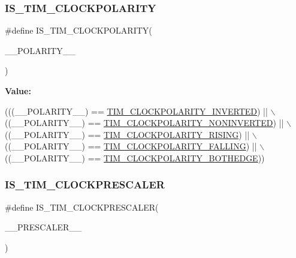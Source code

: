 \subsubsection{\texorpdfstring{I\+S\+\_\+\+T\+I\+M\+\_\+\+C\+L\+O\+C\+K\+P\+O\+L\+A\+R\+I\+TY}{IS\_TIM\_CLOCKPOLARITY}}
{\footnotesize\ttfamily \#define I\+S\+\_\+\+T\+I\+M\+\_\+\+C\+L\+O\+C\+K\+P\+O\+L\+A\+R\+I\+TY(\begin{DoxyParamCaption}\item[{}]{\+\_\+\+\_\+\+P\+O\+L\+A\+R\+I\+T\+Y\+\_\+\+\_\+ }\end{DoxyParamCaption})}

{\bfseries Value\+:}
\begin{DoxyCode}
(((\_\_POLARITY\_\_) == \hyperlink{group___t_i_m___clock___polarity_gae4eb585c466c2b5709ae3795204e7d3f}{TIM\_CLOCKPOLARITY\_INVERTED})    || \(\backslash\)
                                            ((\_\_POLARITY\_\_) == 
      \hyperlink{group___t_i_m___clock___polarity_gaca342866be2f9364274584688c733b60}{TIM\_CLOCKPOLARITY\_NONINVERTED}) || \(\backslash\)
                                            ((\_\_POLARITY\_\_) == 
      \hyperlink{group___t_i_m___clock___polarity_ga13cc7002cfa5ee42607e1a3d85f77b10}{TIM\_CLOCKPOLARITY\_RISING})      || \(\backslash\)
                                            ((\_\_POLARITY\_\_) == 
      \hyperlink{group___t_i_m___clock___polarity_ga9c17ca08b6179792f5ced4e607808c0a}{TIM\_CLOCKPOLARITY\_FALLING})     || \(\backslash\)
                                            ((\_\_POLARITY\_\_) == 
      \hyperlink{group___t_i_m___clock___polarity_ga89bf9a7962d09fb58ceae4d1e28e1c89}{TIM\_CLOCKPOLARITY\_BOTHEDGE}))
\end{DoxyCode}
\mbox{\label{group___t_i_m___private___macros_gacffcfebcabdbe12264d1f09775693972}} 
\subsubsection{\texorpdfstring{I\+S\+\_\+\+T\+I\+M\+\_\+\+C\+L\+O\+C\+K\+P\+R\+E\+S\+C\+A\+L\+ER}{IS\_TIM\_CLOCKPRESCALER}}
{\footnotesize\ttfamily \#define I\+S\+\_\+\+T\+I\+M\+\_\+\+C\+L\+O\+C\+K\+P\+R\+E\+S\+C\+A\+L\+ER(\begin{DoxyParamCaption}\item[{}]{\+\_\+\+\_\+\+P\+R\+E\+S\+C\+A\+L\+E\+R\+\_\+\+\_\+ }\end{DoxyParamCaption})}

